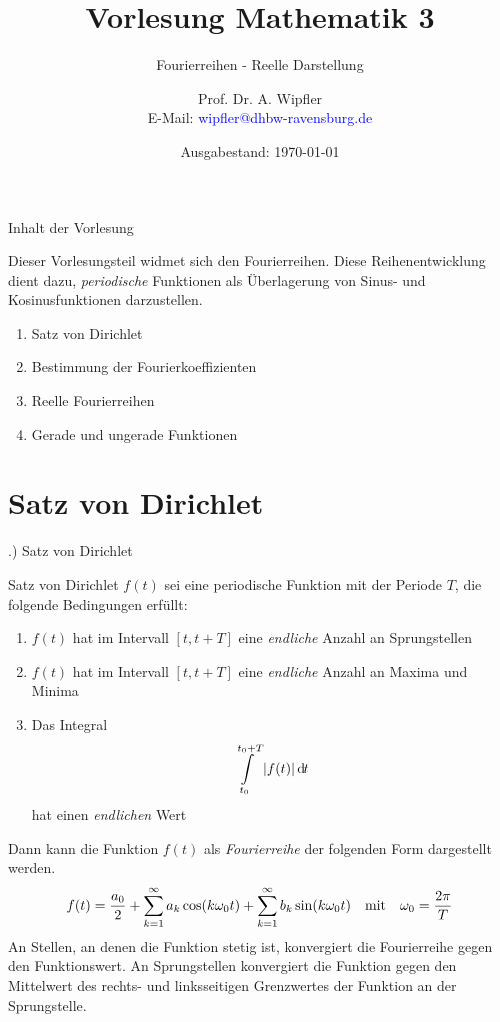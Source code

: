 \documentclass[t,14pt]{beamer}
\title[]{Vorlesung Mathematik 3}
\subtitle{Fourierreihen - Reelle Darstellung}
\author[]{Prof. Dr. A. Wipfler\\ E-Mail: \textcolor{blue}{wipfler@dhbw-ravensburg.de}}
\institute[]{{\footnotesize Duale Hochschule Baden-W\"urttemberg, Ravensburg/Friedrichshafen}}
\date[]{Ausgabestand: \today}
\newcommand*\diff{\mathop{}\!\mathrm{d\hspace{-1pt}}}	%
\newcommand{\mitm}{\quad\textnormal{mit}\quad}
\begin{document}
\begin{frame}
\titlepage
\end{frame}





\begin{frame}{Inhalt der Vorlesung}


Dieser Vorlesungsteil widmet sich den Fourierreihen. Diese Reihenentwicklung dient dazu, \emph{periodische} Funktionen als Überlagerung von Sinus- 
und Kosinusfunktionen darzustellen.
\begin{enumerate}
\item Satz von Dirichlet
\item Bestimmung der Fourierkoeffizienten
\item Reelle Fourierreihen
\item Gerade und ungerade Funktionen
\end{enumerate}

\end{frame}

\section{Satz von Dirichlet}
\begin{frame}{\thesection .) Satz von Dirichlet}
\begin{alertblock}{Satz von Dirichlet}
$f(t)$ sei eine periodische Funktion mit der Periode $T$, die folgende Bedingungen erfüllt:
\begin{enumerate}
\item $f(t)$ hat im Intervall $[t,t+T]$ eine \emph{endliche} Anzahl an Sprungstellen
\item $f(t)$ hat im Intervall $[t,t+T]$ eine \emph{endliche} Anzahl an Maxima und Minima
\item Das Integral
\[
\intl_{t_0}^{t_0+T}|f(t)|\diff t 
\]
hat einen \emph{endlichen} Wert
\end{enumerate}
Dann kann die Funktion $f(t)$ als \emph{Fourierreihe} der folgenden Form dargestellt werden.
\[
f(t)=\frac{a_0}{2}+\suml_{k=1}^{\infty}a_k\cos(k\omega_0 t)+\suml_{k=1}^{\infty}b_k\sin(k\omega_0 t) \mitm \omega_0=\frac{2\pi}{T}
\]
An Stellen, an denen die Funktion stetig ist, konvergiert die Fourierreihe gegen den Funktionswert. An Sprungstellen konvergiert die Funktion 
gegen den Mittelwert des rechts- und linksseitigen Grenzwertes der Funktion an der Sprungstelle.
\end{alertblock}
\end{frame}
\end{document}
